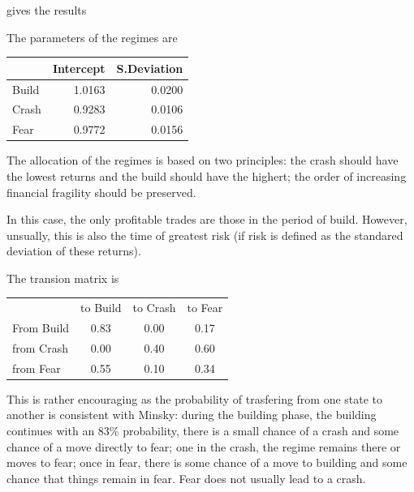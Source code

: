 \documentclass[12pt, a4paper, oneside]{article} %
\begin{document}
gives the results
 
 
The parameters of the regimes are 
 
 
\begin{centering}
\begin{tabular}{l r r}
& Intercept & S.Deviation\\
\hline
Build & 1.0163 & 0.0200\\
Crash & 0.9283 & 0.0106\\
Fear & 0.9772 & 0.0156
\end{tabular}
\end{centering}
  
The allocation of the regimes is based on two principles:  the crash should have the lowest returns and the build should have the highert; the order of increasing financial fragility should be preserved.  

In this case, the only profitable trades are those in the period of build.  However, unsually, this is also the time of greatest risk (if risk is defined as the standared deviation of these returns).  

The transion matrix is 

 \begin{centering}
 \begin{tabular}{l c c c}
 & to Build & to Crash & to Fear\\
 From Build & 0.83 & 0.00 & 0.17\\
 from Crash & 0.00 & 0.40 & 0.60\\
 from Fear & 0.55 & 0.10 & 0.34
 \end{tabular}
 \end{centering}

This is rather encouraging as the probability of trasfering from one state to another is consistent with Minsky:  during the building phase, the building continues with an 83\% probability, there is a small chance of a crash and some chance of a move directly to fear; one in the crash, the regime remains there or moves to fear; once in fear, there is some chance of a move to building and some chance that things remain in fear.  Fear does not usually lead to a crash. 
\end{document}
